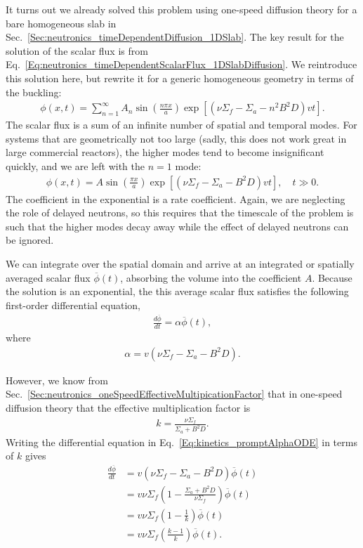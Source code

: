 It turns out we already solved this problem using one-speed diffusion theory for a bare homogeneous slab in Sec.~\ref{Sec:neutronics_timeDependentDiffusion_1DSlab}. The key result for the solution of the scalar flux is from Eq.~\eqref{Eq:neutronics_timeDependentScalarFlux_1DSlabDiffusion}. We reintroduce this solution here, but rewrite it for a generic homogeneous geometry in terms of the buckling:
\begin{align}
  \phi(x,t) = \sum_{n=1}^\infty A_n \sin \left( \frac{ n \pi x }{ a } \right) \exp \left[ \left( \nu \Sigma_f - \Sigma_a - n^2 B^2 D \right) v t \right]  .
\end{align}
The scalar flux is a sum of an infinite number of spatial and temporal modes. For systems that are geometrically not too large (sadly, this does not work great in large commercial reactors), the higher modes tend to become insignificant quickly, and we are left with the $n = 1$ mode:
\begin{align}
  \phi(x,t) = A \sin \left( \frac{ \pi x }{ a } \right) \exp \left[ \left( \nu \Sigma_f - \Sigma_a - B^2 D \right) v t \right]  , \quad t \gg 0.
\end{align}
The coefficient in the exponential is a rate coefficient. Again, we are neglecting the role of delayed neutrons, so this requires that the timescale of the problem is such that the higher modes decay away while the effect of delayed neutrons can be ignored. 

We can integrate over the spatial domain and arrive at an integrated or spatially averaged scalar flux $\overline{\phi}(t)$, absorbing the volume into the coefficient $A$. Because the solution is an exponential, the this average scalar flux satisfies the following first-order differential equation,
\begin{align}
  \frac{d \overline{\phi}}{dt} = \alpha \overline{\phi}(t) , \label{Eq:kinetics_promptAlphaODE}
\end{align}
where
\begin{align}
  \alpha = v \left( \nu \Sigma_f - \Sigma_a - B^2 D \right) .
\end{align}

However, we know from Sec.~\ref{Sec:neutronics_oneSpeedEffectiveMultipicationFactor} that in one-speed diffusion theory that the effective multiplication factor is
\begin{align}
  k = \frac{ \nu \Sigma_f }{ \Sigma_a + B^2 D } .
\end{align}
Writing the differential equation in Eq.~\eqref{Eq:kinetics_promptAlphaODE} in terms of $k$ gives
\begin{align}
  \frac{d \overline{\phi}}{dt} 
  &=  v \left( \nu \Sigma_f - \Sigma_a - B^2 D \right) \overline{\phi}(t) \nonumber \\
  &=  v \nu \Sigma_f \left( 1 - \frac{ \Sigma_a + B^2 D}{ \nu\Sigma_f} \right)  \overline{\phi}(t) \nonumber \\
  &=  v \nu \Sigma_f \left( 1 - \frac{1}{k} \right)  \overline{\phi}(t) \nonumber \\
  &=  v \nu \Sigma_f \left( \frac{ k - 1 }{k} \right)  \overline{\phi}(t) . \label{Eq:kinetics_derivationPromptKineticsEquationAsReactivity}
\end{align}

